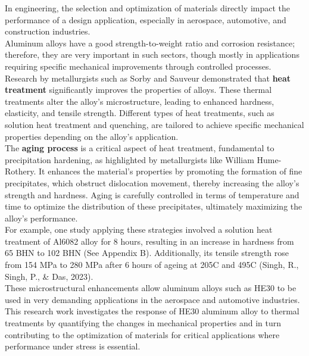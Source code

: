 \documentclass{article}
\begin{document}
        In engineering, the selection and optimization of materials directly impact the performance of a design application, especially in aerospace, automotive, and construction industries. \\[8pt]
        \noindent
        Aluminum alloys have a good strength-to-weight ratio and corrosion resistance; therefore, they are very important in such sectors, though mostly in applications requiring specific mechanical improvements through controlled processes. \\[8pt]
        \noindent
        Research by metallurgists such as Sorby and Sauveur demonstrated that \textbf{heat treatment} significantly improves the properties of alloys. These thermal treatments alter the alloy's microstructure, leading to enhanced hardness, elasticity, and tensile strength. Different types of heat treatments, such as solution heat treatment and quenching, are tailored to achieve specific mechanical properties depending on the alloy’s application.\\[8pt]
        \noindent
        The \textbf{aging process} is a critical aspect of heat treatment, fundamental to precipitation hardening, as highlighted by metallurgists like William Hume-Rothery. It enhances the material's properties by promoting the formation of fine precipitates, which obstruct dislocation movement, thereby increasing the alloy's strength and hardness. Aging is carefully controlled in terms of temperature and time to optimize the distribution of these precipitates, ultimately maximizing the alloy’s performance.\\[8pt]
        \noindent
        For example, one study applying these strategies involved a solution heat treatment of Al6082 alloy for 8 hours, resulting in an increase in hardness from 65 BHN to 102 BHN (See Appendix B). Additionally, its tensile strength rose from 154 MPa to 280 MPa after 6 hours of ageing at 205\textdegree C and 495\textdegree C (Singh, R., Singh, P., \& Das, 2023).\\[8pt]
        \noindent
        These microstructural enhancements allow aluminum alloys such as HE30 to be used in very demanding applications in the aerospace and automotive industries.\\[8pt]
        \noindent
        This research work investigates the response of HE30 aluminum alloy to thermal treatments by quantifying the changes in mechanical properties and in turn contributing to the optimization of materials for critical applications where performance under stress is essential. 
    
\end{document}
